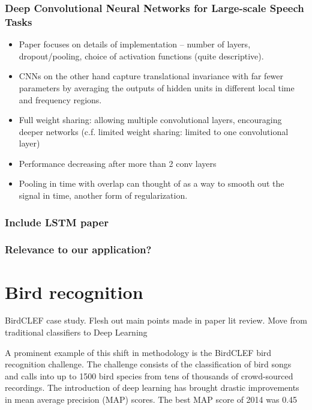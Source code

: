 \documentclass[12pt]{llncs}
\newcommand{\ikn}[1]{\todo[size = \small, color=orange!30]{[ik] #1}}
\begin{document}
\subsubsection*{Deep Convolutional Neural Networks for Large-scale Speech Tasks \cite{sainath2015deep}}
\begin{itemize}
	\item Paper focuses on details of implementation -- number of layers, dropout/pooling, choice of activation functions (quite descriptive). 
	\item CNNs on the other hand capture translational invariance with far fewer parameters by averaging the outputs of hidden units in different local time and frequency regions.
	\item Full weight sharing: allowing multiple convolutional layers, encouraging deeper networks (c.f. limited weight sharing: limited to one convolutional layer)
	\item Performance decreasing after more than 2 conv layers
	\item Pooling in time with overlap can thought of as a way to smooth out the signal in time, another form of regularization.
\end{itemize}

\subsubsection{Include LSTM paper}

\subsubsection{Relevance to our application?}\ikn{Not sure if necessary}






\section{Bird recognition}
\label{sec:birdrecognition}
BirdCLEF case study. Flesh out main points made in paper lit review. Move from traditional classifiers to Deep Learning

A prominent example of this shift in methodology is the BirdCLEF bird recognition challenge. The challenge consists of the classification of bird songs and calls into up to 1500 bird species from tens of thousands of crowd-sourced recordings. The introduction of deep learning has brought drastic improvements in mean average precision (MAP) scores. The best MAP score of 2014 was 0.45 \cite{goeau2015lifeclef}
\end{document}
